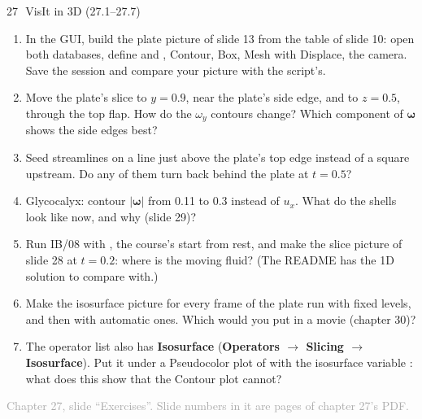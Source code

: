 \documentclass[aspectratio=169,11pt]{beamer}
\newcommand{\sourcecredit}[1]{\vfill\begin{flushright}\tiny\textcolor{DarkGray}{#1}\end{flushright}}
\providecommand{\gui}[1]{\textsf{\textbf{#1}}}
\begin{document}
\begin{frame}{27\,\textbullet\ VisIt in 3D (27.1--27.7)}
\label{fr:c27x1}
\footnotesize
\begin{enumerate}
  \item[27.1] In the GUI, build the plate picture of slide 13 from the table of slide 10: open both databases, define  and , Contour, Box, Mesh with Displace, the camera. Save the session and compare your picture with the script's.
  \item[27.2] Move the plate's slice to $y = 0.9$, near the plate's side edge, and to $z = 0.5$, through the top flap. How do the $\omega_y$ contours change? Which component of $\boldsymbol\omega$ shows the side edges best?
  \item[27.3] Seed streamlines on a line just above the plate's top edge instead of a square upstream. Do any of them turn back behind the plate at $t = 0.5$?
  \item[27.4] Glycocalyx: contour $|\boldsymbol{\omega}|$ from 0.11 to 0.3 instead of $u_x$. What do the shells look like now, and why (slide 29)?
  \item[27.5] Run IB/08 with , the course's start from rest, and make the slice picture of slide 28 at $t = 0.2$: where is the moving fluid? (The README has the 1D solution to compare with.)
  \item[27.6] Make the isosurface picture for every frame of the plate run with fixed levels, and then with automatic ones. Which would you put in a movie (chapter 30)?
  \item[27.7] The operator list also has \gui{Isosurface} (\gui{Operators $\to$ Slicing $\to$ Isosurface}). Put it under a Pseudocolor plot of  with the isosurface variable : what does this show that the Contour plot cannot?
\end{enumerate}
\sourcecredit{Chapter 27, slide ``Exercises''. Slide numbers in it are pages of chapter 27's PDF.}
\end{frame}
\end{document}
